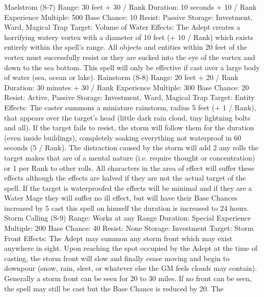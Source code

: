 \documentclass[a4paper]{article}
\begin{document}
\begin{multicols}{3}
Maelstrom (S-7)
Range: 30 feet + 30 / Rank
Duration: 10 seconds + 10 / Rank
Experience Multiple: 500
Base Chance: 10%
Resist: Passive
Storage: Investment, Ward, Magical Trap
Target: Volume of Water
Effects: The Adept creates a horrifying watery
vortex with a diameter of 10 feet (+ 10 / Rank)
which exists entirely within the spell’s range. All
objects and entities within 20 feet of the vortex
must successfully resist or they are sucked into the
eye of the vortex and down to the sea bottom. This
spell will only be effective if cast over a large body
of water (sea, ocean or lake).
Rainstorm (S-8)
Range: 20 feet + 20 / Rank
Duration: 30 minutes + 30 / Rank
Experience Multiple: 300
Base Chance: 20%
Resist: Active, Passive
Storage: Investment, Ward, Magical Trap
Target: Entity
Effects: The caster summons a miniature rainstorm,
radius 5 feet (+ 1 / Rank), that appears over the
target’s head (little dark rain cloud, tiny lightning
bolts and all). If the target fails to resist, the storm
will follow them for the duration (even inside
buildings), completely soaking everything not
waterproof in 60 seconds (5 / Rank). The distraction caused by the storm will add 2%
any rolls the target makes that are of a mental
nature (i.e. require thought or concentration) or 1%
per Rank to other rolls. All characters in the area of
effect will suffer these effects although the effects
are halved if they are not the actual target of the
spell. If the target is waterproofed the effects will
be minimal and if they are a Water Mage they will
suffer no ill effect, but will have their Base
Chances increased by 5%
cast this spell on himself the duration is increased
to 24 hours.
Storm Calling (S-9)
Range: Works at any Range
Duration: Special
Experience Multiple: 200
Base Chance: 40%
Resist: None
Storage: Investment
Target: Storm Front
Effects: The Adept may summon any storm front
which may exist anywhere in sight. Upon reaching
the spot occupied by the Adept at the time of casting, the storm front will slow and finally cease
moving and begin to downpour (snow, rain, sleet,
or whatever else the GM feels clouds may contain).
Generally a storm front can be seen for 20 to 30
miles. If no front can be seen, the spell may still be
cast but the Base Chance is reduced by 20. The


\end{multicols}
\end{document}
